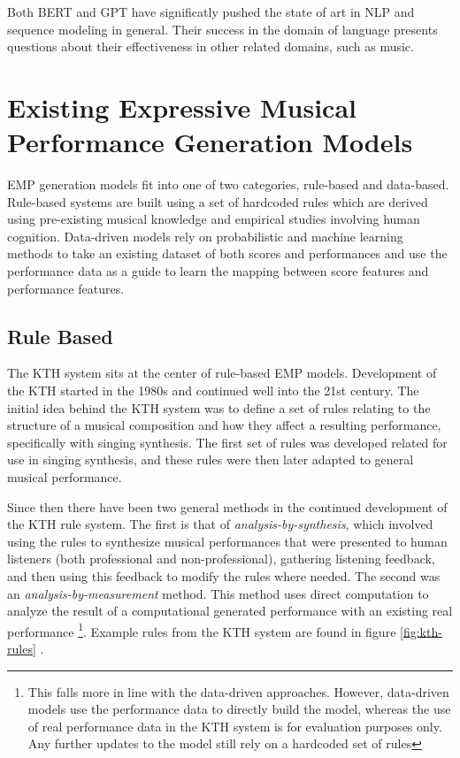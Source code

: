 Both BERT and GPT have significatly pushed the state of art in NLP and sequence modeling in general. Their success in the domain of language presents questions about their effectiveness in other related domains, such as music. 


\section{Existing Expressive Musical Performance Generation Models}
EMP generation models fit into one of two categories, rule-based and data-based. Rule-based systems are built using a set of hardcoded rules which are derived using pre-existing musical knowledge and empirical studies involving human cognition. Data-driven models rely on probabilistic and machine learning methods to take an existing dataset of both scores and performances and use the performance data as a guide to learn the mapping between score features and performance features. 

\subsection{Rule Based}
The KTH system \cite{friberg2006overview} sits at the center of rule-based EMP models. Development of the KTH started in the 1980s and continued well into the 21st century. The initial idea behind the KTH system was to define a set of rules relating to the structure of a musical composition and how they affect a resulting performance, specifically with singing synthesis. The first set of rules was developed related for use in singing synthesis, and these rules were then later adapted to general musical performance. 

Since then there have been two general methods in the continued development of the KTH rule system. The first is that of \emph{analysis-by-synthesis}, which involved using the rules to synthesize musical performances that were presented to human listeners (both professional and non-professional), gathering listening feedback, and then using this feedback to modify the rules where needed. The second was an \emph{analysis-by-measurement} method. This method uses direct computation to analyze the result of a computational generated performance with an existing real performance \footnote{This falls more in line with the data-driven approaches. However, data-driven models use the performance data to directly build the model, whereas the use of real performance data in the KTH system is for evaluation purposes only. Any further updates to the model still rely on a hardcoded set of rules}. Example rules from the KTH system are found in figure \ref{fig:kth-rules} . 

